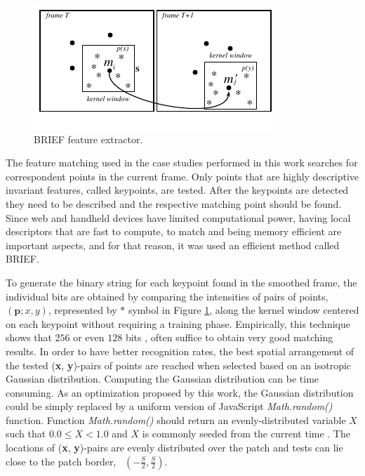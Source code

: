 \begin{figure}[!htb]
  \centering
  \includegraphics[width=\linewidth]{chapters/tracking_library_for_the_web/BRIEF.pdf}
  \caption{BRIEF \cite{Lepetit2005} feature extractor.}
  \label{figure:BRIEF}
\end{figure}

The feature matching used in the case studies performed in this work searches for correspondent points in the current frame. Only points that are highly descriptive invariant features, called keypoints, are tested. After the keypoints are detected they need to be described and the respective matching point should be found. Since web and handheld devices have limited computational power, having local descriptors that are fast to compute, to match and being memory efficient are important aspects, and for that reason, it was used an efficient method called BRIEF.

To generate the binary string for each keypoint found in the smoothed frame, the individual bits are obtained by comparing the intensities of pairs of points, $(\textbf{p}; x, y)$, represented by $\ast$ symbol in Figure \ref{figure:BRIEF}, along the kernel window centered on each keypoint without requiring a training phase.
Empirically, this technique shows that $256$ or even $128$ bits \cite{Calonder2010}, often suffice to obtain very good matching results. In order to have better recognition rates, the best spatial arrangement of the tested (\textbf{x}, \textbf{y})-pairs of points are reached when selected based on an isotropic Gaussian distribution. Computing the Gaussian distribution can be time consuming. As an optimization proposed by this work, the Gaussian distribution could be simply replaced by a uniform version of JavaScript \textit{Math.random()} function. Function \textit{Math.random()} should return an evenly-distributed variable $X$ such that $0.0 \le X < 1.0$ and $X$ is commonly seeded from the current time \cite{International2009}. The locations of (\textbf{x}, \textbf{y})-pairs are evenly distributed over the patch and tests can lie close to the patch border, \ie\ $(-\frac{S}{2},\frac{S}{2})$.

